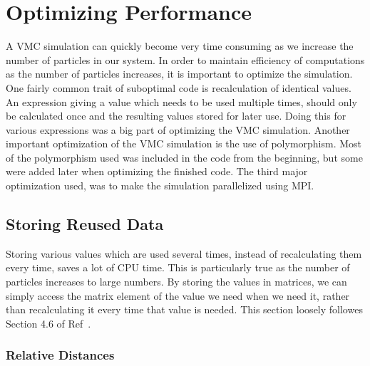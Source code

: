 \documentclass[../main.tex]{subfiles}
\begin{document}



\chapter{Optimizing Performance}

A VMC simulation can quickly become very time consuming as we increase the number of particles in our system. In order to maintain efficiency of computations as the number of particles increases, it is important to optimize the simulation. One fairly common trait of suboptimal code is recalculation of identical values. An expression giving a value which needs to be used multiple times, should only be calculated once and the resulting values stored for later use. Doing this for various expressions was a big part of optimizing the VMC simulation. Another important optimization of the VMC simulation is the use of polymorphism. Most of the polymorphism used was included in the code from the beginning, but some were added later when optimizing the finished code. The third major optimization used, was to make the simulation parallelized using MPI.

\section{Storing Reused Data}

Storing various values which are used several times, instead of recalculating them every time, saves a lot of CPU time. This is particularly true as the number of particles increases to large numbers. By storing the values in matrices, we can simply access the matrix element of the value we need when we need it, rather than recalculating it every time that value is needed. This section loosely followes Section 4.6 of Ref~\cite{}.

\subsection{Relative Distances}
\end{document}
